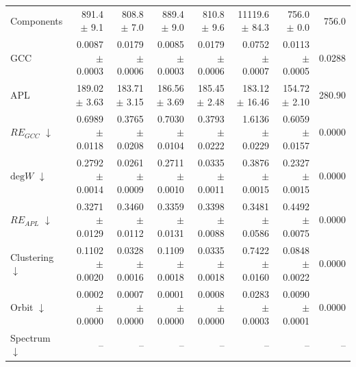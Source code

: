 \begin{table}[H]
\begin{tabular}{lrrrrrrr}
Components                    & 891.4 $\pm$ 9.1 & 808.8 $\pm$ 7.0 & 889.4 $\pm$ 9.0 & 810.8 $\pm$ 9.6 & 11119.6 $\pm$ 84.3 & 756.0 $\pm$ 0.0 & 756.0 \\
GCC                           & 0.0087 $\pm$ 0.0003 & 0.0179 $\pm$ 0.0006 & 0.0085 $\pm$ 0.0003 & 0.0179 $\pm$ 0.0006 & 0.0752 $\pm$ 0.0007 & 0.0113 $\pm$ 0.0005 & 0.0288 \\
APL                           & 189.02 $\pm$ 3.63 & 183.71 $\pm$ 3.15 & 186.56 $\pm$ 3.69 & 185.45 $\pm$ 2.48 & 183.12 $\pm$ 16.46 & 154.72 $\pm$ 2.10 & 280.90 \\
\midrule
$RE_{GCC}$ $\downarrow$       & 0.6989 $\pm$ 0.0118 & 0.3765 $\pm$ 0.0208 & 0.7030 $\pm$ 0.0104 & 0.3793 $\pm$ 0.0222 & 1.6136 $\pm$ 0.0229 & 0.6059 $\pm$ 0.0157 & 0.0000 \\
$\mathrm{deg}W$ $\downarrow$  & 0.2792 $\pm$ 0.0014 & 0.0261 $\pm$ 0.0009 & 0.2711 $\pm$ 0.0010 & 0.0335 $\pm$ 0.0011 & 0.3876 $\pm$ 0.0015 & 0.2327 $\pm$ 0.0015 & 0.0000 \\
$RE_{APL}$ $\downarrow$       & 0.3271 $\pm$ 0.0129 & 0.3460 $\pm$ 0.0112 & 0.3359 $\pm$ 0.0131 & 0.3398 $\pm$ 0.0088 & 0.3481 $\pm$ 0.0586 & 0.4492 $\pm$ 0.0075 & 0.0000 \\
Clustering $\downarrow$       & 0.1102 $\pm$ 0.0020 & 0.0328 $\pm$ 0.0016 & 0.1109 $\pm$ 0.0018 & 0.0335 $\pm$ 0.0018 & 0.7422 $\pm$ 0.0160 & 0.0848 $\pm$ 0.0022 & 0.0000 \\
Orbit $\downarrow$            & 0.0002 $\pm$ 0.0000 & 0.0007 $\pm$ 0.0000 & 0.0001 $\pm$ 0.0000 & 0.0008 $\pm$ 0.0000 & 0.0283 $\pm$ 0.0003 & 0.0090 $\pm$ 0.0001 & 0.0000 \\
Spectrum $\downarrow$         & -- & -- & -- & -- & -- & -- & -- \\
\bottomrule
\end{tabular}
\end{table}

